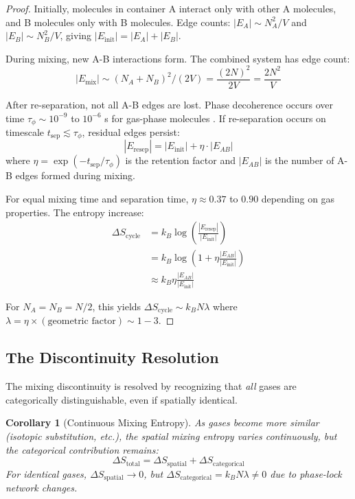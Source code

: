 \documentclass[twocolumn,superscriptaddress,prb,10pt]{revtex4-2}
\newtheorem{corollary}[theorem]{Corollary}
\theoremstyle{definition}
\theoremstyle{remark}
\begin{document}
\begin{proof}
Initially, molecules in container A interact only with other A molecules, and B molecules only with B molecules. Edge counts: $|E_A| \sim N_A^2 / V$ and $|E_B| \sim N_B^2 / V$, giving $|E_{\text{init}}| = |E_A| + |E_B|$.

During mixing, new A-B interactions form. The combined system has edge count:
\begin{equation}
|E_{\text{mix}}| \sim (N_A + N_B)^2 / (2V) = \frac{(2N)^2}{2V} = \frac{2N^2}{V}
\end{equation}

After re-separation, not all A-B edges are lost. Phase decoherence occurs over time $\tau_{\phi} \sim 10^{-9}$ to $10^{-6}$ s for gas-phase molecules \cite{plenio2013}. If re-separation occurs on timescale $t_{\text{sep}} \lesssim \tau_{\phi}$, residual edges persist:
\begin{equation}
|E_{\text{resep}}| = |E_{\text{init}}| + \eta \cdot |E_{AB}|
\end{equation}
where $\eta = \exp(-t_{\text{sep}}/\tau_{\phi})$ is the retention factor and $|E_{AB}|$ is the number of A-B edges formed during mixing.

For equal mixing time and separation time, $\eta \approx 0.37$ to $0.90$ depending on gas properties. The entropy increase:
\begin{align}
\Delta S_{\text{cycle}} &= k_B \log\left(\frac{|E_{\text{resep}}|}{|E_{\text{init}}|}\right) \\
&= k_B \log\left(1 + \eta \frac{|E_{AB}|}{|E_{\text{init}}|}\right) \\
&\approx k_B \eta \frac{|E_{AB}|}{|E_{\text{init}}|}
\end{align}

For $N_A = N_B = N/2$, this yields $\Delta S_{\text{cycle}} \sim k_B N \lambda$ where $\lambda = \eta \times (\text{geometric factor}) \sim 1-3$.
\end{proof}

\subsection{The Discontinuity Resolution}

The mixing discontinuity is resolved by recognizing that \emph{all} gases are categorically distinguishable, even if spatially identical.

\begin{corollary}[Continuous Mixing Entropy]
As gases become more similar (isotopic substitution, etc.), the spatial mixing entropy varies continuously, but the categorical contribution remains:
\begin{equation}
\Delta S_{\text{total}} = \Delta S_{\text{spatial}} + \Delta S_{\text{categorical}}
\end{equation}
For identical gases, $\Delta S_{\text{spatial}} \to 0$, but $\Delta S_{\text{categorical}} = k_B N \lambda \neq 0$ due to phase-lock network changes.
\end{corollary}
\end{document}

